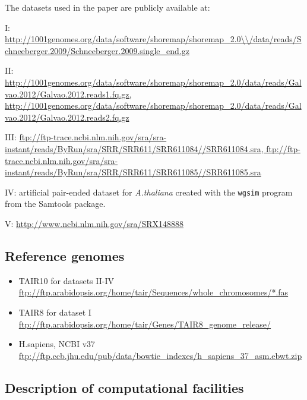 \documentclass[10pt]{article}
\begin{document}
The datasets used in the paper are publicly available at:

I: \url{http://1001genomes.org/data/software/shoremap/shoremap\_2.0\\/data/reads/Schneeberger.2009/Schneeberger.2009.single\_end.gz}

II: \url{http://1001genomes.org/data/software/shoremap/shoremap\_2.0/data/reads/Galvao.2012/Galvao.2012.reads1.fq.gz, http://1001genomes.org/data/software/shoremap/shoremap\_2.0/data/reads/Galvao.2012/Galvao.2012.reads2.fq.gz}	

III: \url{ftp://ftp-trace.ncbi.nlm.nih.gov/sra/sra-instant/reads/ByRun/sra/SRR/SRR611/SRR611084//SRR611084.sra, ftp://ftp-trace.ncbi.nlm.nih.gov/sra/sra-instant/reads/ByRun/sra/SRR/SRR611/SRR611085//SRR611085.sra}

IV: artificial pair-ended dataset for {\it A.thaliana} created with the {\tt wgsim} program from the Samtools package.

V: \url{http://www.ncbi.nlm.nih.gov/sra/SRX148888}


\subsection*{Reference genomes}
\begin{itemize}
\item TAIR10 for datasets II-IV \url{ftp://ftp.arabidopsis.org/home/tair/Sequences/whole\_chromosomes/*.fas}
\item TAIR8 for dataset I \url{ftp://ftp.arabidopsis.org/home/tair/Genes/TAIR8\_genome\_release/}
\item H.sapiens, NCBI v37 \url{ftp://ftp.ccb.jhu.edu/pub/data/bowtie\_indexes/h\_sapiens\_37\_asm.ebwt.zip}
\end{itemize}

\subsection*{Description of computational facilities}
\end{document}
